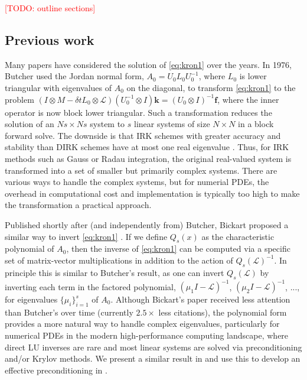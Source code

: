 \documentclass[review]{siamart}
\makeatletter
\newcommand{\todo}[1]{\textcolor{red}{[TODO\@: #1]}}
\makeatother
\begin{document}
\todo{outline sections}

\subsection{Previous work}\label{sec:intro:prev}


Many papers have considered the solution of \eqref{eq:kron1} over the years. In 1976,
Butcher \cite{butcher76} used the Jordan normal form, $A_0 = U_0L_0U_0^{-1}$, where
$L_0$ is lower triangular with eigenvalues of $A_0$ on the diagonal, to transform
\eqref{eq:kron1} to the problem
$(I\otimes M - \delta t L_0\otimes \mathcal{L})(U_0^{-1}\otimes I)\mathbf{k} =
(U_0\otimes I)^{-1}\mathbf{f}$, where the inner operator is now block lower triangular.
Such a transformation reduces the solution of an $Ns\times Ns$ system to $s$ linear
systems of size $N\times N$ in a block forward solve. The downside is that
IRK schemes with greater accuracy and stability than DIRK schemes have at most one real
eigenvalue \cite{hairer96,butcher2016numerical}.
Thus, for IRK methods such as Gauss or Radau integration, the original real-valued
system is transformed into a set of smaller but primarily complex systems. There are various
ways to handle the complex systems,
but for numerial PDEs, the overhead in computational cost and implementation is typically
too high to make the transformation a practical approach.  

Published shortly after (and independently from) Butcher, Bickart proposed a similar
way to invert \eqref{eq:kron1} \cite{bickart77}. If we define $Q_s(x)$ as
the characteristic polynomial of $A_0$, then the inverse of \eqref{eq:kron1} can be computed
via a specific set of matrix-vector multiplications in addition to the action of
$Q_s(\mathcal{L})^{-1}$.
In principle this is similar to Butcher's result, as one can invert
$Q_s(\mathcal{L})$ by inverting 
each term in the factored polynomial, $(\mu_1 I-\mathcal{L})^{-1}$,
$(\mu_2 I-\mathcal{L})^{-1}$, ..., for eigenvalues $\{\mu_i\}_{i=1}^s$ of $A_0$.
Although Bickart's paper received less attention than Butcher's over time (currently $2.5\times$
less citations), the polynomial form provides a more natural way to handle complex eigenvalues,
particularly for numerical PDEs in the modern high-performance computing landscape,
where direct LU inverses are rare and most linear systems are solved via preconditioning
and/or Krylov methods. We present a similar result in  and use this to
develop an effective preconditioning in .
\end{document}
